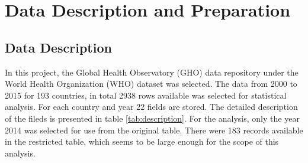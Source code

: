 \section{Data Description and Preparation}
\label{sec:data-preparation}

\subsection{Data Description}
\label{sec:data-description}

In this project, the Global Health Observatory (GHO) data repository under the World Health Organization (WHO) dataset \cite{WHO} was selected.  The data from 2000 to 2015 for 193 countries, in total 2938 rows available was selected for statistical analysis. For each country and year 22 fields are stored. The detailed description of the fileds is presented in table \ref{tab:description}. For the analysis, only the year 2014 was selected for use from the original table. There were 183 records available in the restricted table, which seems to be large enough for the scope of this analysis.


